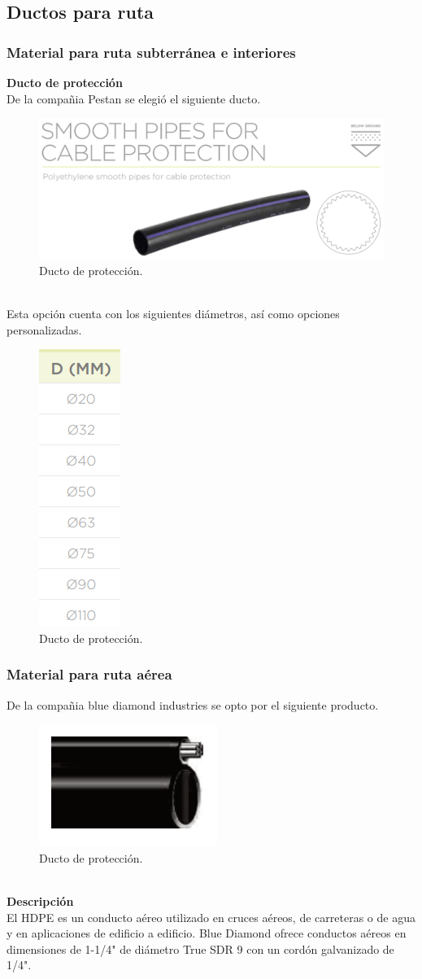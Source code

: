 \documentclass[12pt,letterpaper]{article}
\begin{document}
\subsection{Ductos para ruta}
\subsubsection{Material para ruta subterránea e interiores}
\textbf{Ducto de protección}
\\
De la compañia Pestan se elegió el siguiente ducto.
\begin{figure}[ht]
    \centering
    \includegraphics[width=.5\textwidth]{f13.png}
    \caption{Ducto de protección.}
\end{figure}
\\
Esta opción cuenta con los siguientes diámetros, así como opciones personalizadas.
\begin{figure}[ht]
    \centering
    \includegraphics[width=.1\textwidth]{f14.png}
    \caption{Ducto de protección.}
\end{figure}

\subsubsection{Material para ruta aérea}
De la compañia blue diamond industries se opto por el siguiente producto.
\begin{figure}[ht]
    \centering
    \includegraphics[width=.5\textwidth]{f15.png}
    \caption{Ducto de protección.}
\end{figure}
\\
\textbf{Descripción}
\\
El HDPE es un conducto aéreo utilizado en cruces aéreos, de carreteras o de agua 
y en aplicaciones de edificio a edificio. Blue Diamond ofrece conductos aéreos en 
dimensiones de 1-1/4" de diámetro True SDR 9 con un cordón galvanizado de 1/4".
\end{document}
